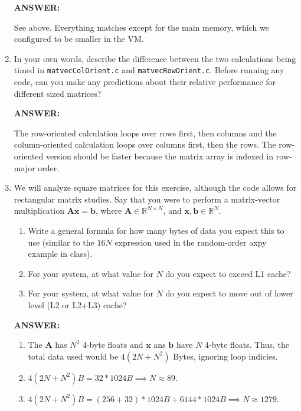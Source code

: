 \documentclass[letter]{article}
\renewcommand{\vec}[1]{\ensuremath{\boldsymbol{#1}}} %
\begin{document}
\begin{enumerate}
        \textbf{ANSWER:} %

        See above.  Everything matches except for the main memory, which we configured to be smaller in the VM.
        
        \item In your own words, describe the difference between the two calculations being timed in \texttt{matvecColOrient.c} and \texttt{matvecRowOrient.c}. Before running any code, can you make any predictions about their relative performance for different sized matrices? 
        
        \textbf{ANSWER:} %

        The row-oriented calculation loops over rows first, then columns and the column-oriented calculation loops over columns first, then the rows.  The row-oriented version should be faster because the matrix array is indexed in row-major order.
        
        \item We will analyze square matrices for this exercise, although the code allows for rectangular matrix studies. Say that you were to perform a matrix-vector multiplication $\vec{A}\vec{x} = \vec{b}$, where $\vec{A} \in \mathbb{R}^{N\times N}$, and $\vec{x}, \vec{b} \in \mathbb{R}^N$. 
            \begin{enumerate}
                \item Write a general formula for how many bytes of data you expect this to use (similar to the $16N$ expression used in the random-order axpy example in class).
                \item For your system, at what value for $N$ do you expect to exceed L1 cache? 
                \item For your system, at what value for $N$ do you expect to move out of lower level (L2 or L2+L3) cache? 
            \end{enumerate}
        
        \textbf{ANSWER:} %

            \begin{enumerate}
                \item The \vec{A} has $N^2$ 4-byte floats and \vec{x} ans \vec{b} have $N$ 4-byte floats.  Thus, the total data used would be $4(2N+N^2)$ Bytes, ignoring loop indicies.
                \item $4(2N+N^2) B= 32*1024B \implies N \approx 89$.
                \item $4(2N+N^2) B= (256+32)*1024B + 6144*1024B \implies N \approx 1279$.
            \end{enumerate}


\end{enumerate}
\end{document}
